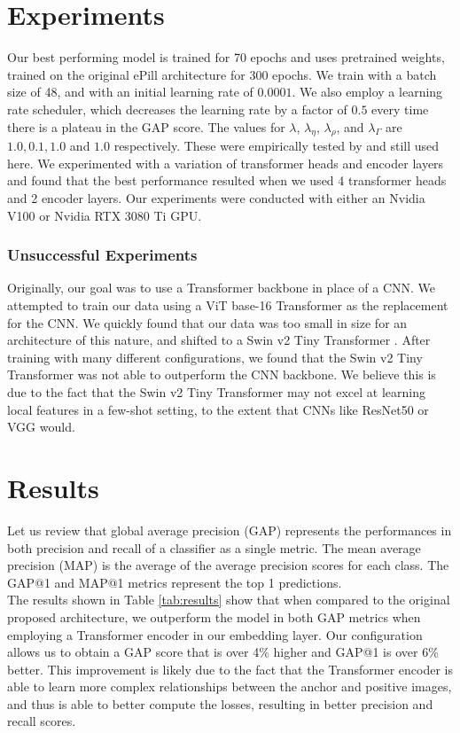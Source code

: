 \documentclass[10pt,twocolumn,letterpaper]{article}
\begin{document}
\section{Experiments}

    
Our best performing model is trained for 70 epochs and uses pretrained weights, trained on the original ePill architecture for 300 epochs. We train with a batch size of 48, 
and with an initial learning rate of $0.0001$. We also employ a learning rate scheduler, which decreases the learning rate by a factor of $0.5$ 
every time there is a plateau in the GAP score. The values for $\lambda$, $\lambda_\eta$, $\lambda_\rho$, and $\lambda_\Gamma$ are $1.0,0.1,1.0$ and $1.0$ 
respectively. These were empirically tested by \cite{ePill} and still used here. We experimented with a variation of transformer heads and encoder layers and found that the best
performance resulted when we used 4 transformer heads and 2 encoder layers.
Our experiments were conducted with either an Nvidia V100 or Nvidia RTX 3080 Ti GPU.

\subsubsection{Unsuccessful Experiments}
Originally, our goal was to use a Transformer backbone in place of a CNN. We attempted to train our data using a ViT base-16 Transformer \cite{an_imageworth} 
as the replacement for the CNN. We quickly found that our data was too small in size for an architecture of this nature, and shifted to a Swin v2 Tiny Transformer 
\cite{swinv2}. After training with many different configurations, we found that the Swin v2 Tiny Transformer was not able to outperform the CNN backbone. We believe 
this is due to the fact that the Swin v2 Tiny Transformer may not excel at learning local features in a few-shot setting, to the extent that CNNs like ResNet50
or VGG would. 


\section{Results}

Let us review that global average precision (GAP) represents the performances in both precision and recall of a classifier as a single metric. The mean average precision 
(MAP) is the average of the average precision scores for each class. The GAP@1 and MAP@1 metrics represent the top 1 predictions. 
\\

The results shown in Table \ref{tab:results} show that when
compared to the original proposed architecture, we outperform the model in both GAP metrics when employing a Transformer encoder in our embedding layer. Our configuration
allows us to obtain a GAP score that is over 4\% higher and GAP@1 is over 6\% better. This improvement is likely due to the fact that the Transformer encoder is able to
learn more complex relationships between the anchor and positive images, and thus is able to better compute the losses, resulting in better precision and recall scores. 
\end{document}
